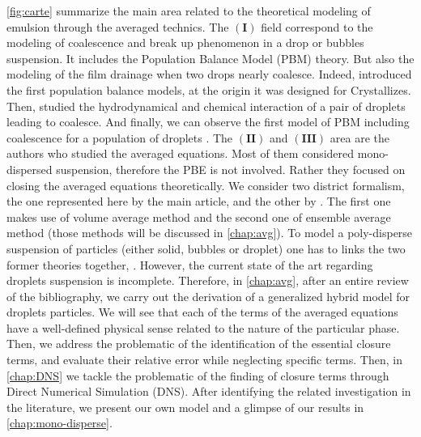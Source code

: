 \ref{fig:carte} summarize the main area related to the theoretical modeling of emulsion through the averaged technics. 
The $\bm{(I)}$ field correspond to the modeling of coalescence and break up phenomenon in a drop or bubbles suspension.
It includes the Population Balance Model (PBM) theory.  
But also the modeling of the film drainage when two drops nearly coalesce. 
Indeed, \citet{randolph2012theory} introduced the first population balance models, at the origin it was designed  for Crystallizes. 
Then, \citet{chesters1991modelling} studied the hydrodynamical and chemical interaction of a pair of droplets leading to coalesce.
And finally, we can observe the first model of PBM including coalescence for a population of droplets \citep{KAMP20011363}.  
The $\bm{(II)}$ and $\bm{(III)}$ area are the authors who studied the averaged equations.
Most of them considered mono-dispersed suspension, therefore the PBE is not involved.
Rather they focused on closing the averaged equations theoretically. 
We consider two district formalism, the one represented here by the main article, \citet{jackson1997locally} and the other by \citet{zhang1994averaged}.
The first one makes use of volume average method and the second one of ensemble average method (those methods will be discussed in \ref{chap:avg}).
To model a poly-disperse suspension of particles (either solid, bubbles or droplet) one has to links the two former theories together, \citep{morel2015mathematical}. 
However, the current state of the art regarding droplets suspension is incomplete.
Therefore, in \ref{chap:avg}, after an entire review of the bibliography, we carry out the derivation of a generalized hybrid model for droplets particles. 
We will see that each of the terms of the averaged equations have a well-defined physical sense related to the nature of the particular phase. 
Then, we address the problematic of the identification of the essential closure terms, and evaluate their relative error while neglecting specific terms. 
Then, in \ref{chap:DNS} we tackle the problematic of the finding of closure terms through Direct Numerical Simulation (DNS).
After identifying the related investigation in the literature, we present our own model and a glimpse of our results in \ref{chap:mono-disperse}. 

